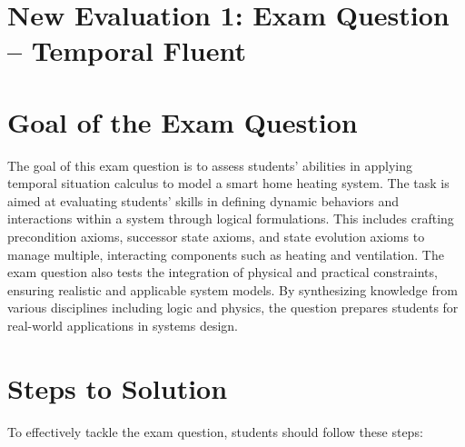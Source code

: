 \documentclass{assignment}
\date{\today}
\begin{document}


    

\begin{problem}

\section*{New Evaluation 1: Exam Question -- Temporal Fluent}
\section*{Goal of the Exam Question}

The goal of this exam question is to assess students' abilities in applying temporal situation calculus to model a smart home heating system. The task is aimed at evaluating students' skills in defining dynamic behaviors and interactions within a system through logical formulations. This includes crafting precondition axioms, successor state axioms, and state evolution axioms to manage multiple, interacting components such as heating and ventilation. The exam question also tests the integration of physical and practical constraints, ensuring realistic and applicable system models. By synthesizing knowledge from various disciplines including logic and physics, the question prepares students for real-world applications in systems design.

\section*{Steps to Solution}

To effectively tackle the exam question, students should follow these steps:


\end{problem}
\end{document}
